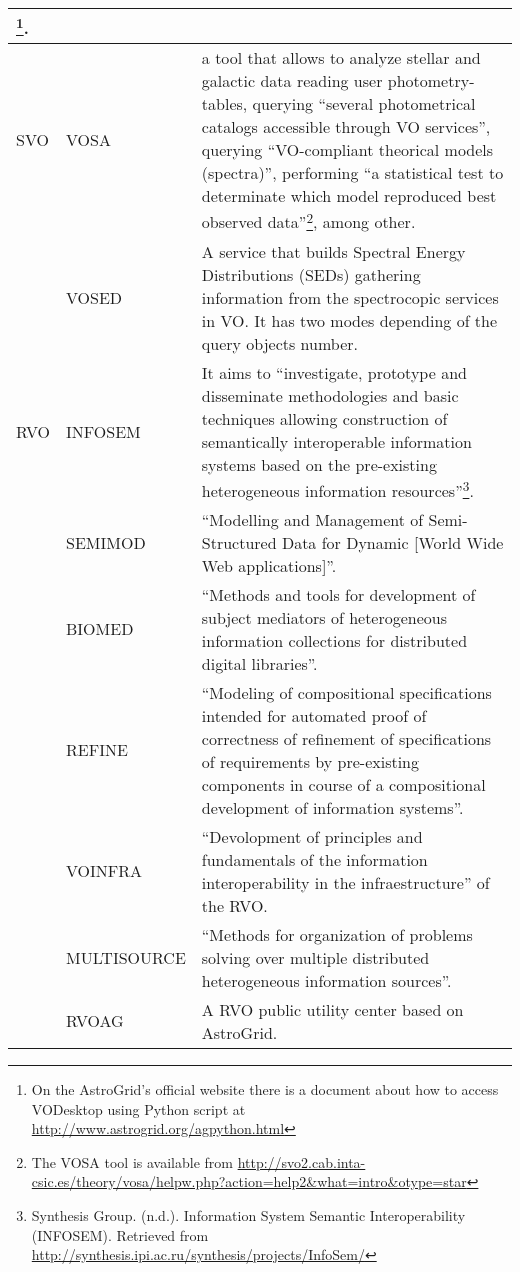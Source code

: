\begin{table*}[h!t]
\begin{tabular}{|l|p{3cm}|p{12.5cm}|}
								\footnote{On the AstroGrid's official website there is a document about how to access VODesktop using Python script at 
								\url{http://www.astrogrid.org/agpython.html}}.\\
	\hline
	SVO		& VOSA & a tool that allows to analyze stellar and galactic data reading user photometry-tables, querying ``several photometrical 
								catalogs accessible through VO services'', querying ``VO-compliant theorical models (spectra)'', performing ``a 
								statistical test to determinate which model reproduced best observed data''\footnote{The VOSA tool is available from 
								\url{http://svo2.cab.inta-csic.es/theory/vosa/helpw.php?action=help2&what=intro&otype=star}}, among other. \\
			& VOSED & A service that builds Spectral Energy Distributions (SEDs) gathering information from the spectrocopic services in VO. It has two
								modes depending of the query objects number. \\
	\hline
	RVO		& INFOSEM & It aims to ``investigate, prototype and disseminate methodologies and basic techniques allowing construction of semantically 
								interoperable information systems based on the pre-existing heterogeneous information resources''\footnote{Synthesis Group. 
								(n.d.). Information System Semantic Interoperability (INFOSEM). Retrieved from 
								\url{http://synthesis.ipi.ac.ru/synthesis/projects/InfoSem/}}. \\
			& SEMIMOD & ``Modelling and Management of Semi-Structured Data for Dynamic [World Wide Web applications]''. \\
			& BIOMED & ``Methods and tools for development of subject mediators of he\-te\-ro\-ge\-neous information collections for distributed digital 
								libraries''.\\
			& REFINE & ``Modeling of compositional specifications intended for automated proof of correctness of refinement of specifications of 								requirements by pre-existing components in course of a compositional development of information systems''.\\
			& VOINFRA & ``Devolopment of principles and fundamentals of the information interoperability in the infraestructure'' of the RVO. \\
			& MULTISOURCE & ``Methods for organization of problems solving over multiple distributed heterogeneous information sources''.\\
			& RVOAG & A RVO public utility center based on AstroGrid. \\

\end{tabular}
\end{table*}
